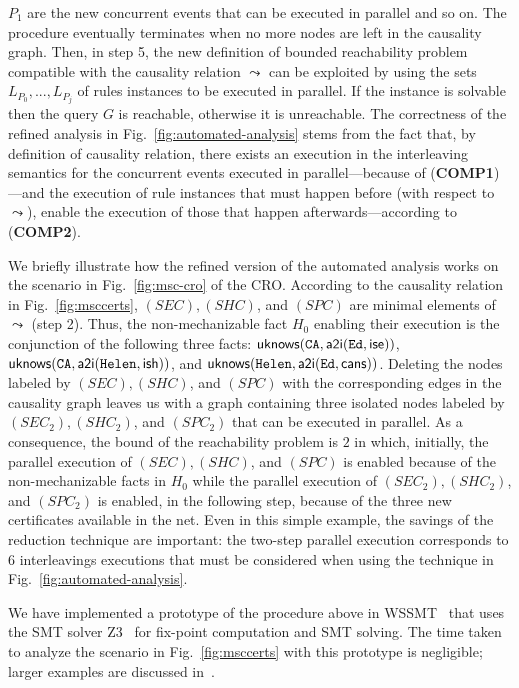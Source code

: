 \documentclass[conference]{llncs}
\newcommand{\theCA}{\ensuremath \mathtt{CA}}
\newcommand{\Ed}{\ensuremath \mathtt{Ed}}
\newcommand{\Helen}{\ensuremath \mathtt{Helen}}
\newcommand{\canstoredoc}{\ensuremath \mathsf{cans}}
\newcommand{\ishead}{\ensuremath \mathsf{ish}}
\newcommand{\isemployee}{\ensuremath \mathsf{ise}}
\newcommand{\atoi}{\ensuremath \mathsf{a2i}}
\newcommand{\knowzero}{\ensuremath \mathsf{uknows}}
\newcommand{\CRO}{CRO}
\begin{document}
{$P_1$ are the new concurrent events that can be executed in parallel
and so on.  The procedure eventually terminates when no more nodes are
left in the causality graph.  Then, in step 5, the new definition of
bounded reachability problem compatible with the causality relation
$\leadsto$ can be exploited by using the sets $L_{P_0}, ..., L_{P_j}$
of rules instances to be executed in parallel.  If the instance is
solvable then the query $G$ is reachable, otherwise it is unreachable.
The correctness of the refined analysis in
Fig.~\ref{fig:automated-analysis} stems from the fact that, by
definition of causality relation, there exists an execution in the
interleaving semantics for the concurrent events executed in
parallel---because of (\textbf{COMP1})---and the execution of rule
instances that must happen before (with respect to $\leadsto$), enable
the execution of those that happen afterwards---according to
(\textbf{COMP2}).

We briefly illustrate how the refined version of the automated
analysis works on the scenario in Fig.~\ref{fig:msc-cro} of the
\CRO{}.  According to the causality relation in
Fig.~\ref{fig:msccerts}, $(SEC), (SHC)$, and $(SPC)$ are minimal
elements of $\leadsto$ (step 2).  Thus, the non-mechanizable fact
$H_0$ enabling their execution is the conjunction of the following
three facts: $\knowzero(\theCA, \atoi(\Ed,\isemployee))$,
$\knowzero(\theCA, \atoi(\Helen,\ishead))$, and $\knowzero(\Helen,
\atoi(\Ed,\canstoredoc))$.  Deleting the nodes labeled by $(SEC),
(SHC)$, and $(SPC)$ with the corresponding edges in the causality
graph leaves us with a graph containing three isolated nodes labeled
by $(SEC_2), (SHC_2)$, and $(SPC_2)$ that can be executed in parallel.
As a consequence, the bound of the reachability problem is $2$ in
which, initially, the parallel execution of $(SEC), (SHC)$, and
$(SPC)$ is enabled because of the non-mechanizable facts in $H_0$
while the parallel execution of $(SEC_2), (SHC_2)$, and $(SPC_2)$ is
enabled, in the following step, because of the three new certificates
available in the net.  Even in this simple example, the savings of the
reduction technique are important: the two-step parallel execution
corresponds to 
$6$ interleavings executions that must be considered
when using the technique in Fig.~\ref{fig:automated-analysis}.

We have implemented a prototype of the procedure above in
WSSMT~\cite{BCRVZ} that uses the SMT solver Z3~\cite{z3} for fix-point
computation and SMT solving.  The time taken to analyze the scenario
in Fig.~\ref{fig:msccerts} with this prototype is negligible; larger
examples are discussed in~\cite{BCRVZ}.

}
\end{document}
